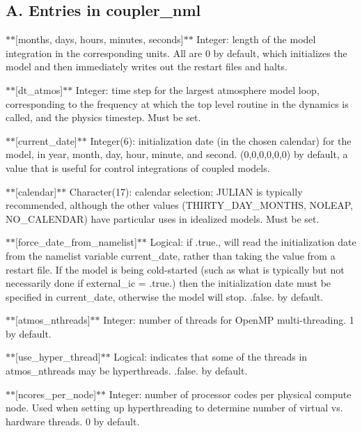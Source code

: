 \subsection*{A. Entries in coupler\-\_\-nml}

$\ast$$\ast$\mbox{[}months, days, hours, minutes, seconds\mbox{]}$\ast$$\ast$ Integer\-: length of the model integration in the corresponding units. All are 0 by default, which initializes the model and then immediately writes out the restart files and halts.

$\ast$$\ast$\mbox{[}dt\-\_\-atmos\mbox{]}$\ast$$\ast$ Integer\-: time step for the largest atmosphere model loop, corresponding to the frequency at which the top level routine in the dynamics is called, and the physics timestep. Must be set.

$\ast$$\ast$\mbox{[}current\-\_\-date\mbox{]}$\ast$$\ast$ Integer(6)\-: initialization date (in the chosen calendar) for the model, in year, month, day, hour, minute, and second. (0,0,0,0,0,0) by default, a value that is useful for control integrations of coupled models.

$\ast$$\ast$\mbox{[}calendar\mbox{]}$\ast$$\ast$ Character(17)\-: calendar selection; J\-U\-L\-I\-A\-N is typically recommended, although the other values (T\-H\-I\-R\-T\-Y\-\_\-\-D\-A\-Y\-\_\-\-M\-O\-N\-T\-H\-S, N\-O\-L\-E\-A\-P, N\-O\-\_\-\-C\-A\-L\-E\-N\-D\-A\-R) have particular uses in idealized models. Must be set.

$\ast$$\ast$\mbox{[}force\-\_\-date\-\_\-from\-\_\-namelist\mbox{]}$\ast$$\ast$ Logical\-: if .true., will read the initialization date from the namelist variable current\-\_\-date, rather than taking the value from a restart file. If the model is being cold-\/started (such as what is typically but not necessarily done if external\-\_\-ic = .true.) then the initialization date must be specified in current\-\_\-date, otherwise the model will stop. .false. by default.

$\ast$$\ast$\mbox{[}atmos\-\_\-nthreads\mbox{]}$\ast$$\ast$ Integer\-: number of threads for Open\-M\-P multi-\/threading. 1 by default.

$\ast$$\ast$\mbox{[}use\-\_\-hyper\-\_\-thread\mbox{]}$\ast$$\ast$ Logical\-: indicates that some of the threads in atmos\-\_\-nthreads may be hyperthreads. .false. by default.

$\ast$$\ast$\mbox{[}ncores\-\_\-per\-\_\-node\mbox{]}$\ast$$\ast$ Integer\-: number of processor codes per physical compute node. Used when setting up hyperthreading to determine number of virtual vs. hardware threads. 0 by default.

